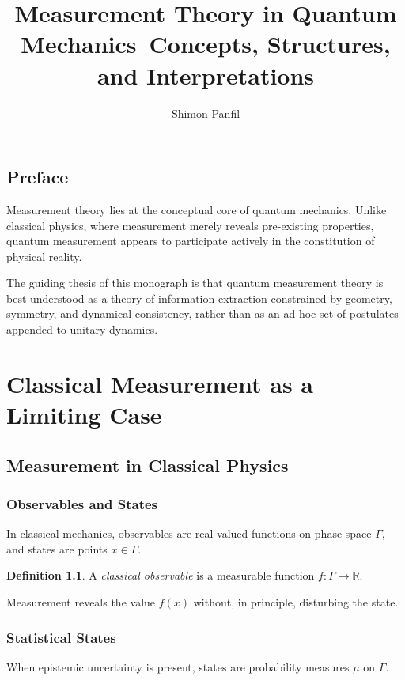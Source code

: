 \documentclass[12pt]{book}
\theoremstyle{plain}
\theoremstyle{definition}
\newtheorem{definition}[theorem]{Definition}
\theoremstyle{remark}
\begin{document}
\frontmatter

\title{Measurement Theory in Quantum Mechanics\
\large Concepts, Structures, and Interpretations}
\author{Shimon Panfil}
\date{}
\maketitle

\tableofcontents

\chapter*{Preface}
Measurement theory lies at the conceptual core of quantum mechanics. Unlike classical physics, where measurement merely reveals pre-existing properties, quantum measurement appears to participate actively in the constitution of physical reality.

The guiding thesis of this monograph is that quantum measurement theory is best understood as a theory of information extraction constrained by geometry, symmetry, and dynamical consistency, rather than as an ad hoc set of postulates appended to unitary dynamics.

\mainmatter

\part{Classical Measurement as a Limiting Case}

\chapter{Measurement in Classical Physics}

\section{Observables and States}
In classical mechanics, observables are real-valued functions on phase space $\Gamma$, and states are points $x \in \Gamma$.

\begin{definition}
A \emph{classical observable} is a measurable function $f : \Gamma \to \mathbb{R}$.
\end{definition}

Measurement reveals the value $f(x)$ without, in principle, disturbing the state.

\section{Statistical States}
When epistemic uncertainty is present, states are probability measures $\mu$ on $\Gamma$.
\end{document}
